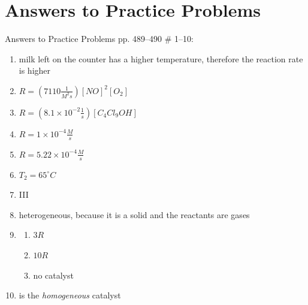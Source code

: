 \documentclass[11pt, oneside]{article}   	%
\begin{document}
\printbibliography


\section*{Answers to Practice Problems}
Answers to Practice Problems pp. 489--490 \# 1--10:
\begin{enumerate}
\item milk left on the counter has a higher temperature, therefore the reaction rate is higher
\item $R = (7110 \frac{1}{M^{2} s}) [NO]^{2} [O_{2}]$
\item $R = (8.1 \times 10^{-2} \frac{1}{s}) [C_{4} Cl_{9} OH]$
\item $R = 1 \times 10^{-4} \frac{M}{s}$
\item $R = 5.22 \times 10^{-4} \frac{M}{s}$
\item $T_{2} = 65 ^{\circ} C$
\item III
\item heterogeneous, because it is a solid and the reactants are gases
\item 
\begin{enumerate}
\item $3 R$
\item $10 R$
\item no catalyst
\end{enumerate}
\item {} is the \emph{homogeneous} catalyst
\end{enumerate}
\end{document}
